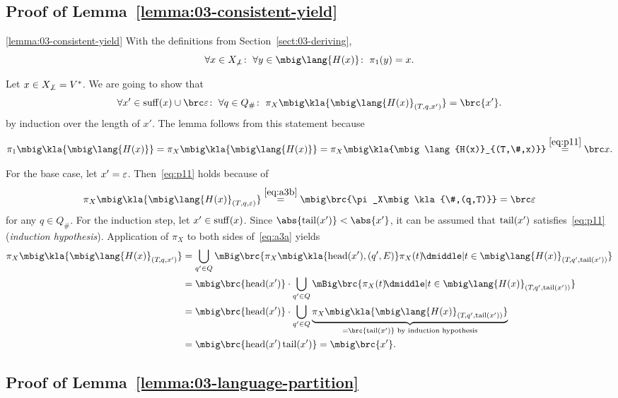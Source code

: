 \subsection{Proof of Lemma~\ref{lemma:03-consistent-yield}}

\begin{repeatlemma}{\ref{lemma:03-consistent-yield}}
 With the definitions from Section~\ref{sect:03-deriving},
 \[
  \forall x\in X_{\not\bot}\colon\;
  \forall y\in \mbig\lang{H(x)}\colon\;
  \pi_1(y) = x.
 \]
\end{repeatlemma}

Let $x\in X_{\not\bot} = V^*$. We are going to show that
\begin{equation}\label{eq:p11}
 \forall x'\in\suff(x)\cup\brc\eps\colon\;
 \forall q\in Q_\#\colon\;
 \pi_X\mbig\kla{\mbig\lang{H(x)}_{(T,q,x')}} = \brc{x'}.
\end{equation}
by induction over the length of $x'$. The lemma follows from this statement because
\[
 \pi_1\mbig\kla{\mbig\lang{H(x)}}
 = \pi_X\mbig\kla{\mbig\lang{H(x)}}
 = \pi_X\mbig\kla{\mbig\lang{H(x)}_{(T,\#,x)}} \overset{\eqref{eq:p11}}= \brc x.
\]

For the base case, let $x' = \varepsilon$. Then~\eqref{eq:p11} holds because of
\[
 \pi_X\mbig\kla{\mbig\lang{H(x)}_{(T,q,\eps)}}
 \overset{\eqref{eq:a3b}}=
 \mbig\brc{\pi_X\mbig\kla{\#,(q,T)}} = \brc\eps
\]
for any $q\in Q_\#$. For the induction step, let $x'\in\operatorname{suff}(x)$. Since
$\abs{\cdr(x')} < \abs{x'}$, it can be assumed that $\operatorname{tail}(x')$
satisfies~\eqref{eq:p11} (\emph{induction hypothesis}). Application of $\pi_X$
to both sides of~\eqref{eq:a3a} yields
\begin{align*}
 \pi_X\mbig\kla{\mbig\lang{H(x)}_{(T\!,q,x')}}
 &= \bigcup_{q'\in Q}\mBig\brc{\pi_X\mbig\kla{\car(x'),(q',E)}\pi_X(t) \!\dmiddle| t\in\mbig\lang{H(x)}_{(T\!,q',\cdr(x'))}} \\
 &= \mbig\brc{\car(x')} \cdot \bigcup_{q'\in Q}\mBig\brc{\pi_X(t) \!\dmiddle| t\in\mbig\lang{H(x)}_{(T\!,q',\cdr(x'))}} \\
 &= \mbig\brc{\car(x')} \cdot \bigcup_{q'\in Q}\underbrace{\pi_X\mbig\kla{\mbig\lang{H(x)}_{(T\!,q',\cdr(x'))}}}_{=\brc{\cdr(x')}\text{ by induction hypothesis}} \\
 &= \mbig\brc{\car(x')\cdr(x')} = \mbig\brc{x'}.
\end{align*}

\subsection{Proof of Lemma~\ref{lemma:03-language-partition}}

